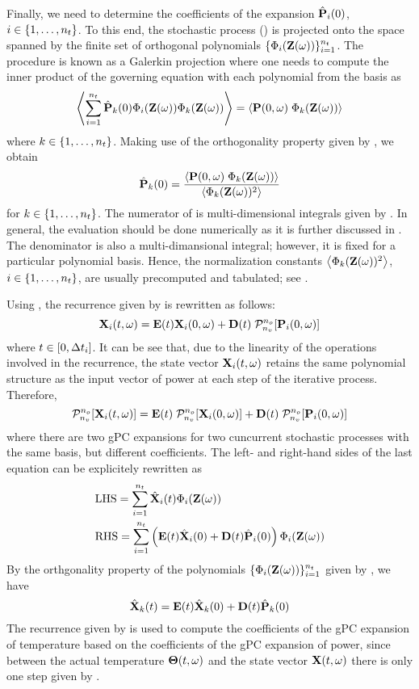 Finally, we need to determine the coefficients of the expansion $\hat{\mathbf{P}}_i(0)$, $i \in \{ 1, \dotsc, {n_t} \}$. To this end, the stochastic process () is projected onto the space spanned by the finite set of orthogonal polynomials $\{ \Phi_i(\mathbf{Z}(\omega)) \}_{i = 1}^{{n_t}}$. The procedure is known as a Galerkin projection where one needs to compute the inner product of the governing equation  with each polynomial from the basis as
\[
  \left\langle \sum_{i=1}^{{n_t}} \hat{\mathbf{P}}_k(0) \Phi_i(\mathbf{Z}(\omega)) \Phi_k(\mathbf{Z}(\omega)) \right\rangle = \left\langle \mathbf{P}(0, \omega) \; \Phi_k(\mathbf{Z}(\omega)) \right\rangle
\]
where $k \in \{ 1, \dotsc, {n_t} \}$. Making use of the orthogonality property given by , we obtain
\begin{equation} \elabel{pc-coefficients}
  \pcc{\vP}_k(0) = \frac{\oInner{\vP(0, \o) \; \pcb_k(\vIRV(\o))}}{\oInner{\pcb_k(\vIRV(\o))^2}}
\end{equation}
for $k \in \{ 1, \dotsc, {n_t} \}$. The numerator of  is multi-dimensional integrals given by . In general, the evaluation should be done numerically as it is further discussed in . The denominator is also a multi-dimansional integral; however, it is fixed for a particular polynomial basis. Hence, the normalization constants $\left\langle \Phi_k(\mathbf{Z}(\omega))^2 \right\rangle$, $i \in \{ 1, \dotsc, {n_t} \}$, are usually precomputed and tabulated; see \cite{ghanem1991}.

Using , the recurrence given by  is rewritten as follows:
\[
  \vX_i(\t, \o) = \mE(\t) \vX_i(0, \o) + \mD(\t) \; \oPC{\vars}{\pcorder}{\vP_i(0, \o)}
\]
where $t \in [0, \Delta t_i]$. It can be see that, due to the linearity of the operations involved in the recurrence, the state vector $\mathbf{X}_i(t, \omega)$ retains the same polynomial structure as the input vector of power at each step of the iterative process. Therefore,
\[
  \oPC{\vars}{\pcorder}{\vX_i(\t, \o)} = \mE(\t) \; \oPC{\vars}{\pcorder}{\vX_i(0, \o)} + \mD(\t) \; \oPC{\vars}{\pcorder}{\vP_i(0, \o)}
\]
where there are two gPC expansions for two cuncurrent stochastic processes with the same basis, but different coefficients. The left- and right-hand sides of the last equation can be explicitely rewritten as
\begin{align*}
  & \text{LHS} = \sum_{i = 1}^{\pcterms} \pcc{\vX}_i(\t) \pcb_i(\vIRV(\o)) \\
  & \text{RHS} = \sum_{i = 1}^{\pcterms} \left( \mE(\t) \pcc{\vX}_i(0) + \mD(\t) \pcc{\vP}_i(0) \right) \pcb_i(\vIRV(\o))
\end{align*}
By the orthgonality property of the polynomials $\{ \Phi_i(\mathbf{Z}(\omega)) \}_{i = 1}^{{n_t}}$ given by , we have
\begin{equation} \elabel{pc-recurrence}
  \pcc{\vX}_k(\t) = \mE(\t) \pcc{\vX}_k(0) + \mD(\t) \pcc{\vP}_k(0)
\end{equation}
The recurrence given by  is used to compute the coefficients of the gPC expansion of temperature based on the coefficients of the gPC expansion of power, since between the actual temperature ${\boldsymbol\Theta}(t, \omega)$ and the state vector $\mathbf{X}(t, \omega)$ there is only one step given by .

